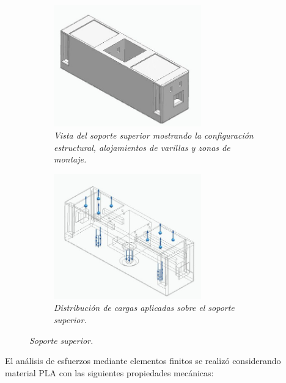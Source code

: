 \begin{figure}[H]
    \centering
    \begin{subfigure}{0.35\textwidth}
        \centering
        \includegraphics[width=0.7\textwidth]{img/SuperiorReal_simplificado_vista.jpg}
        \caption{\textit{Vista del soporte superior mostrando la configuración estructural, alojamientos de varillas y zonas de montaje.}}
        \label{fig:SuperiorReal_simplificado_vista}
    \end{subfigure}
    \hspace{0.5cm}
    \begin{subfigure}{0.35\textwidth}
        \centering
        \includegraphics[width=0.7\textwidth]{img/SuperiorReal_simplificado_fuerzas_app.jpg}
        \caption{\textit{Distribución de cargas aplicadas sobre el soporte superior.}}
        \label{fig:SuperiorReal_simplificado_fuerzas_app}
    \end{subfigure}
    \caption{\textit{Soporte superior.}}
\end{figure}

El análisis de esfuerzos mediante elementos finitos se realizó considerando material PLA con las siguientes propiedades mecánicas:

